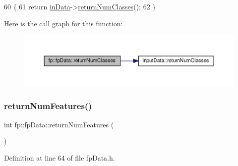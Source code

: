 \begin{DoxyCode}
60                                          \{
61                 \textcolor{keywordflow}{return} \hyperlink{classfp_1_1fpData_a49d7c3f58bcf88843c25b1b0c9714ebe}{inData}->\hyperlink{classinputData_aa87e9181995fe0f15fae83617dba2808}{returnNumClasses}();
62             \}
\end{DoxyCode}
Here is the call graph for this function\+:\nopagebreak
\begin{figure}[H]
\begin{center}
\leavevmode
\includegraphics[width=350pt]{classfp_1_1fpData_a7abfc93af30b7262d59b6d304796a09d_cgraph}
\end{center}
\end{figure}
\mbox{\label{classfp_1_1fpData_a95088e33b280e5c82b3543033d8852e1}} 
\subsubsection{\texorpdfstring{return\+Num\+Features()}{returnNumFeatures()}}
{\footnotesize\ttfamily int fp\+::fp\+Data\+::return\+Num\+Features (\begin{DoxyParamCaption}{ }\end{DoxyParamCaption})\hspace{0.3cm}{\ttfamily [inline]}}



Definition at line 64 of file fp\+Data.\+h.



